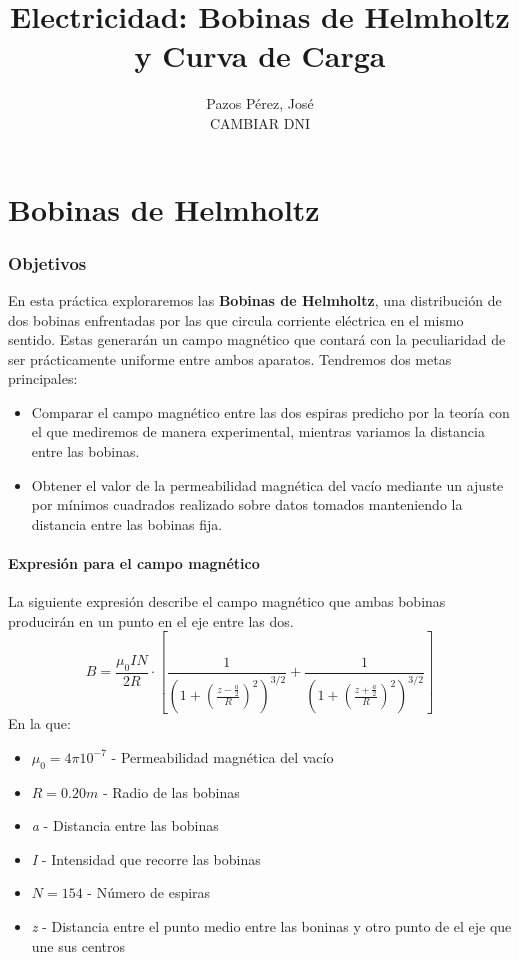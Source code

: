 \documentclass[12pt, a4paper, titlepage]{article}
\title{\textbf {\huge Electricidad: Bobinas de Helmholtz y Curva de Carga}}
\author{{\Large Pazos Pérez, José}\\CAMBIAR DNI}
\date{}
\begin{document}
  \maketitle

  \tableofcontents

  \newpage
  \part{Bobinas de Helmholtz}

  \section{Objetivos}

  En esta práctica exploraremos las \textbf{Bobinas de Helmholtz}, una distribución de dos bobinas enfrentadas por las que circula corriente eléctrica en el mismo sentido. Estas generarán un campo magnético que contará con la peculiaridad de ser prácticamente uniforme entre ambos aparatos. Tendremos dos metas principales:

  \begin{itemize}[label=$-$]
    \item Comparar el campo magnético entre las dos espiras predicho por la teoría con el que mediremos de manera experimental, mientras variamos la distancia entre las bobinas.
    \item Obtener el valor de la permeabilidad magnética del vacío mediante un ajuste por mínimos cuadrados realizado sobre datos tomados manteniendo la distancia entre las bobinas fija.
  \end{itemize}

  \subsection{Expresión para el campo magnético}

  La siguiente expresión describe el campo magnético que ambas bobinas producirán en un punto en el eje entre las dos.
  \begin{equation}
    B = \frac{\mu_0 I N}{2R} \cdot \left[\frac{1}{\left(1 + \left(\frac{z - \frac{a}{2}}{R}\right)^2 \right)^{3/2}} + \frac{1}{\left(1 + \left(\frac{z + \frac{a}{2}}{R}\right)^2 \right)^{3/2}}\right]
    \label{ec:B}
  \end{equation}
  En la que:
  \begin{itemize}[label=$-$]
    \item $\mu_0 = 4 \pi 10^{-7}$ - Permeabilidad magnética del vacío
    \item $R = 0.20m$ - Radio de las bobinas
    \item \textit{a} - Distancia entre las bobinas
    \item \textit{I} - Intensidad que recorre las bobinas
    \item $N = 154$ - Número de espiras
    \item \textit{z} - Distancia entre el punto medio entre las boninas y otro punto de el eje que une sus centros
  \end{itemize}
\end{document}

